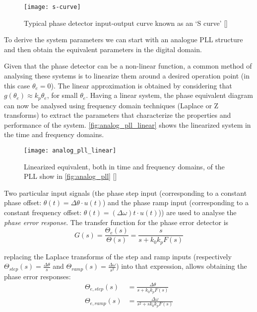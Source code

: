 \begin{figure}[ht]
  \centering
  \texttt{[image: s-curve]}
  \caption{Typical phase detector input-output curve known as an `S curve' [\citeauthor{digcomm_discrete_approach}]}
  \label{fig:s-curve}
\end{figure}

To derive the system parameters we can start with an analogue PLL structure and then obtain the equivalent parameters in the digital domain.

Given that the phase detector can be a non-linear function, a common method of analysing these systems is to linearize them around a desired operation point (in this case $\theta_e=0$). The linear approximation is obtained by considering that $g(\theta_e)\approx k_p \theta_e$, for small $\theta_e$. Having a linear system, the phase equivalent diagram can now be analysed using frequency domain techniques (Laplace or Z transforms) to extract the parameters that characterize the properties and performance of the system. \autoref{fig:analog_pll_linear} shows the linearized system in the time and frequency domains.

\begin{figure}[ht]
  \centering
  \texttt{[image: analog\_pll\_linear]}
  \caption{Linearized equivalent, both in time and frequency domains, of the PLL show in \autoref{fig:analog_pll} [\citeauthor{digcomm_discrete_approach}]}
  \label{fig:analog_pll_linear}
\end{figure}

Two particular input signals (the phase step input (corresponding to a constant phase offset: $\theta(t) = \Delta\theta\cdot u(t)$) and the phase ramp input (corresponding to a constant frequency offset: $\theta(t) = (\Delta \omega)t\cdot u(t)$)) are used to analyse the \emph{phase error response}. The transfer function for the phase error detector is
\begin{equation}
  G(s)=\frac{\Theta_e(s)}{\Theta(s)}=\frac{s}{s+k_0 k_p F(s)}
\end{equation}

replacing the Laplace transforms of the step and ramp inputs (respectively $\Theta_{step}(s)=\frac{\Delta \theta}{s}$ and $\Theta_{ramp}(s)=\frac{\Delta \omega}{s^2}$) into that expression, allows obtaining the phase error responses:
\begin{align}
\Theta_{e,step}(s) & =\frac{\Delta\theta}{s+k_0 k_p F(s)}\\
\Theta_{e,ramp}(s) & =\frac{\Delta\omega}{s^2+s k_0 k_p F(s)}
\end{align}

